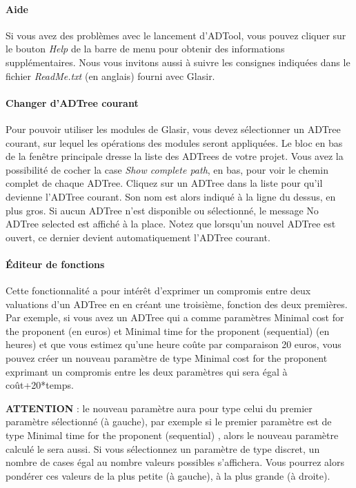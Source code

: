 \paragraph{Aide} Si vous avez des problèmes avec le lancement d'ADTool, vous pouvez cliquer sur le bouton \emph{Help} de la barre de menu pour obtenir des informations supplémentaires. Nous vous invitons aussi à suivre les consignes indiquées dans le fichier \emph{ReadMe.txt} (en anglais) fourni avec Glasir.

\paragraph{Changer d'ADTree courant} Pour pouvoir utiliser les modules de Glasir, vous devez sélectionner un ADTree courant, sur lequel les opérations des modules seront appliquées. Le bloc en bas de la fenêtre principale dresse la liste des ADTrees de votre projet.  Vous avez la possibilité de cocher la case \emph{Show complete path}, en bas, pour voir le chemin complet de chaque ADTree. Cliquez sur un ADTree dans la liste pour qu'il devienne l'ADTree courant. Son nom est alors indiqué à la ligne du dessus, en plus gros. Si aucun ADTree n'est disponible ou sélectionné, le message \og No ADTree selected \fg{} est affiché à la place. Notez que lorsqu'un nouvel ADTree est ouvert, ce dernier devient automatiquement l'ADTree courant.

\paragraph{Éditeur de fonctions} Cette fonctionnalité a pour intérêt d'exprimer un compromis entre deux valuations d'un ADTree en en créant une troisième, fonction des deux premières. Par exemple, si vous avez un ADTree qui a comme paramètres \og Minimal cost for the proponent \fg (en euros) et \og Minimal time for the proponent (sequential) \fg (en heures) et que vous estimez qu'une heure \og coûte \fg par comparaison 20 euros, vous pouvez créer un nouveau paramètre de type \og Minimal cost for the proponent \fg exprimant un compromis entre les deux paramètres qui sera égal à coût+20*temps.

\textbf{ATTENTION} : le nouveau paramètre aura pour type celui du premier paramètre sélectionné (à gauche), par exemple si le premier paramètre est de type \og Minimal time for the proponent (sequential) \fg , alors le nouveau paramètre calculé le sera aussi. Si vous sélectionnez un paramètre de type discret, un nombre de cases égal au nombre valeurs possibles s'affichera. Vous pourrez alors pondérer ces valeurs de la plus petite (à gauche), à la plus grande (à droite).

